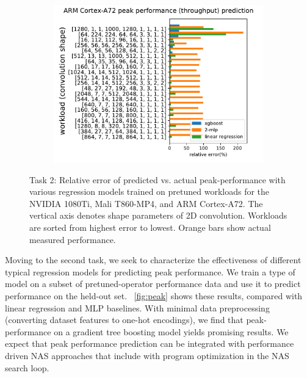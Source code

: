 \begin{figure}[ht]
\begin{center}
\begin{subfigure}[]{\textwidth}
\label{fig:peakmali}
\end{subfigure}
\end{center}
\begin{center}
\begin{subfigure}[]{\textwidth}
\includegraphics[width=\textwidth]{sys_figures/arm_cpu_rk3399_binary_throughput.pdf}
\label{fig:peaka72}
\end{subfigure}
\end{center}
\caption{Task 2: Relative error of predicted vs. actual peak-performance with various regression models trained on pretuned workloads for the NVIDIA 1080Ti, Mali T860-MP4, and ARM Cortex-A72.
The vertical axis denotes shape parameters of 2D convolution.
Workloads are sorted from highest error to lowest. Orange bars show actual measured performance.}
\label{fig:peak}
\end{figure}
Moving to the second task, we seek to characterize the effectiveness of different typical regression models for predicting peak performance. 
We train a type of model on a subset of pretuned-operator performance data and use it to predict performance on the held-out set.
~\autoref{fig:peak} shows these results, compared with linear regression and MLP baselines.
With minimal data preprocessing (converting dataset features to one-hot encodings), we find that peak-performance on a gradient tree boosting model yields promising results.
We expect that peak performance prediction can be integrated with performance driven NAS approaches that include with program optimization in the NAS search loop.


